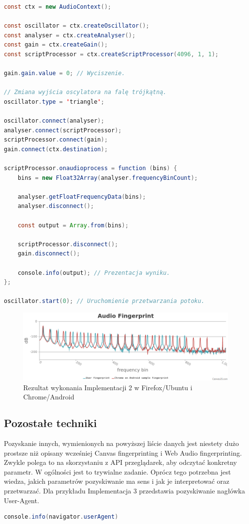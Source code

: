 \begin{lstlisting}[float,language=Java,caption=Podstawowy Web Audio fingerprinting w JavaScript]
const ctx = new AudioContext();

const oscillator = ctx.createOscillator();
const analyser = ctx.createAnalyser();
const gain = ctx.createGain();
const scriptProcessor = ctx.createScriptProcessor(4096, 1, 1);

gain.gain.value = 0; // Wyciszenie.

// Zmiana wyjścia oscylatora na falę trójkątną.
oscillator.type = 'triangle';

oscillator.connect(analyser);
analyser.connect(scriptProcessor);
scriptProcessor.connect(gain);
gain.connect(ctx.destination);

scriptProcessor.onaudioprocess = function (bins) {
    bins = new Float32Array(analyser.frequencyBinCount);

    analyser.getFloatFrequencyData(bins);
    analyser.disconnect();

    const output = Array.from(bins);

    scriptProcessor.disconnect();
    gain.disconnect();

    console.info(output); // Prezentacja wyniku.
};

oscillator.start(0); // Uruchomienie przetwarzania potoku.
\end{lstlisting}

\begin{figure}
	\includegraphics[width=\textwidth,keepaspectratio]{img/08}
	\caption{Rezultat wykonania Implementacji 2 w Firefox/Ubuntu i Chrome/Android}
\end{figure}

\subsection{Pozostałe techniki}
Pozyskanie innych, wymienionych na powyższej liście danych jest niestety dużo
prostsze niż opisany wcześniej Canvas fingerprinting i Web Audio fingerprinting.
Zwykle polega to na skorzystaniu z API przeglądarek, aby odczytać konkretny
parametr. W ogólności jest to trywialne zadanie. Oprócz tego potrzebna jest
wiedza, jakich parametrów pozyskiwanie ma sens i jak je interpretować oraz
przetwarzać. Dla przykładu Implementacja 3 przedstawia pozyskiwanie nagłówka
User-Agent.

\begin{lstlisting}[float,language=Java,caption=Wypisywanie nagłówka User-Agent do konsoli JavaScript]
console.info(navigator.userAgent)
\end{lstlisting}
